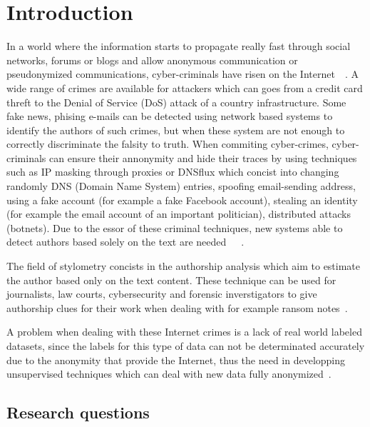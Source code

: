 
\section{Introduction \label{sec:introduction}}

In a world where the information starts to propagate really fast through social networks, forums or blogs and allow anonymous communication or pseudonymized communications, cyber-criminals have risen on the Internet~\cite{automated_unsupervised}~\cite{kocher_pan16}.
A wide range of crimes are available for attackers which can goes from a credit card threft to the Denial of Service (DoS) attack of a country infrastructure.
Some fake news, phising e-mails can be detected using network based systems to identify the authors of such crimes, but when these system are not enough to correctly discriminate the falsity to truth.
When commiting cyber-crimes, cyber-criminals can ensure their annonymity and hide their traces by using techniques such as IP masking through proxies or DNSflux which concist into changing randomly DNS (Domain Name System) entries, spoofing email-sending address, using a fake account (for example a fake Facebook account), stealing an identity (for example the email account of an important politician), distributed attacks (botnets).
Due to the essor of these criminal techniques, new systems able to detect authors based solely on the text are needed~\cite{attribution_in_cyberspace}~\cite{automated_unsupervised}~\cite{unine_pan20_fake_news}.

The field of stylometry concists in the authorship analysis which aim to estimate the author based only on the text content.
These technique can be used for journalists, law courts, cybersecurity and forensic inverstigators to give authorship clues for their work when dealing with for example ransom notes~\cite{pan16_clustering_site}.

A problem when dealing with these Internet crimes is a lack of real world labeled datasets, since the labels for this type of data can not be determinated accurately due to the anonymity that provide the Internet, thus the need in developping unsupervised techniques which can deal with new data fully anonymized~\cite{automated_unsupervised}.

\subsection{Research questions}

